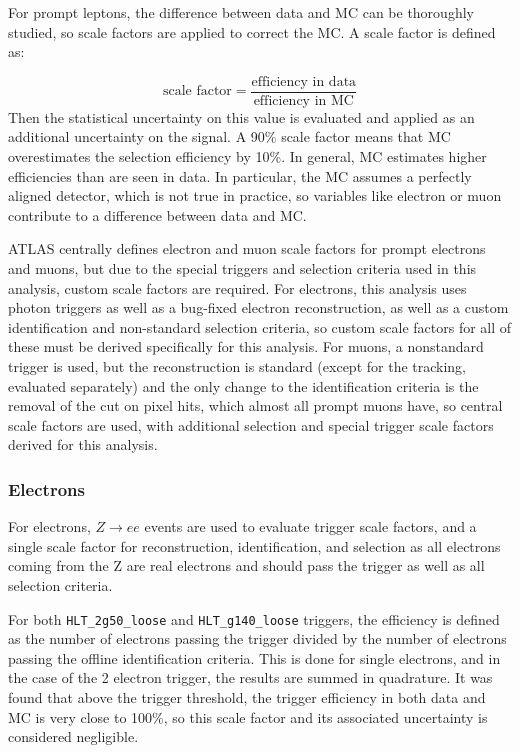 For prompt leptons, the difference between data and \ac{MC} can be thoroughly studied, so scale factors are applied to correct the MC. A scale factor is defined as:

\begin{equation}
\text{scale factor} = \frac{\text{efficiency in data}}{\text{efficiency in MC}}
\end{equation}
Then the statistical uncertainty on this value is evaluated and applied as an additional uncertainty on the signal. A 90\% scale factor means that \ac{MC} overestimates the selection efficiency by 10\%. In general, \ac{MC} estimates higher efficiencies than are seen in data. In particular, the \ac{MC} assumes a perfectly aligned detector, which is not true in practice, so variables like electron \dpt or muon \chiCB contribute to a difference between data and \ac{MC}. 

\ac{ATLAS} centrally defines electron and muon scale factors for prompt electrons and muons, but due to the special triggers and selection criteria used in this analysis, custom scale factors are required. For electrons, this analysis uses photon triggers as well as a bug-fixed electron reconstruction, as well as a custom identification and non-standard selection criteria, so custom scale factors for all of these must be derived specifically for this analysis. For muons, a nonstandard trigger is used, but the reconstruction is standard (except for the tracking, evaluated separately) and the only change to the identification criteria is the removal of the cut on pixel hits, which almost all prompt muons have, so central scale factors are used, with additional selection and special trigger scale factors derived for this analysis.

\subsubsection{Electrons}

For electrons, $Z\rightarrow ee$ events are used to evaluate trigger scale factors, and a single scale factor for reconstruction, identification, and selection as all electrons coming from the Z are real electrons and should pass the trigger as well as all selection criteria.

For both \texttt{HLT\_2g50\_loose} and \texttt{HLT\_g140\_loose} triggers, the efficiency is defined as the number of electrons passing the trigger divided by the number of electrons passing the offline identification criteria. This is done for single electrons, and in the case of the 2 electron trigger, the results are summed in quadrature. It was found that above the trigger threshold, the trigger efficiency in both data and \ac{MC} is very close to 100\%, so this scale factor and its associated uncertainty is considered negligible.

